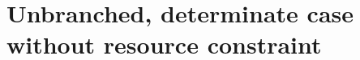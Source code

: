 \documentclass[12pt, oneside]{article}   	%
\begin{document}

\smallskip 





\clearpage
\newpage

\section*{Unbranched, determinate case without resource constraint}
\end{document}
